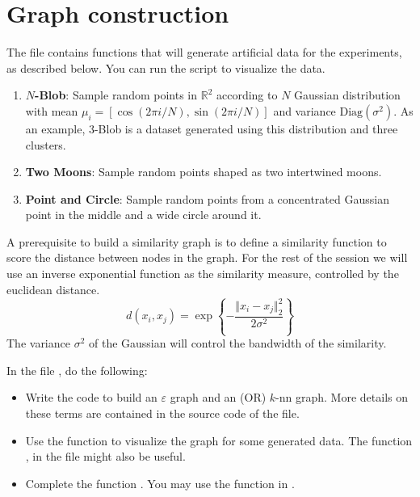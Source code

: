 \documentclass{article}
\begin{document}

\newpage

\section{Graph construction}
The file  contains functions that will generate artificial
data for the experiments, as described below. You can run the script to visualize the data.

\begin{enumerate}
    \item[] \textbf{$N$-Blob}: Sample random points in $\mathbb{R}^2$ according to $N$
        Gaussian distribution with mean
        $\mu_i = [\cos(2\pi i / N),\sin(2\pi i / N)]$ and variance $\mbox{Diag}(\sigma^2)$.
        As an example, 3-Blob is a dataset generated using this distribution
        and three clusters.
    \item[] \textbf{Two Moons}: Sample random points shaped as two intertwined moons.
    \item[] \textbf{Point and Circle}: Sample random points from a concentrated Gaussian
        point in the middle and a wide circle around it.
\end{enumerate}


A prerequisite to build a similarity graph is to define a similarity function
to score the distance between nodes in the graph.
For the rest of the session we will use an inverse exponential function
as the similarity measure, controlled by the euclidean distance.
$$ d(x_i, x_j) = \exp \left\{-\frac{\Vert x_i - x_j \Vert^2_2}{2\sigma^2}\right\}$$
The variance $\sigma^2$ of the Gaussian will control
the bandwidth of the similarity.


In the file , do the following: 
\begin{itemize}
	\item  Write the code to build an $\varepsilon$ graph and an
	(OR) $k$-nn graph. More details on these terms are contained in
	the source code of the file.
	\item Use the function  to visualize the graph for some generated data. The function , in the file  might also be useful.
	\item Complete the function . You may use the function  in .
\end{itemize}
\end{document}
